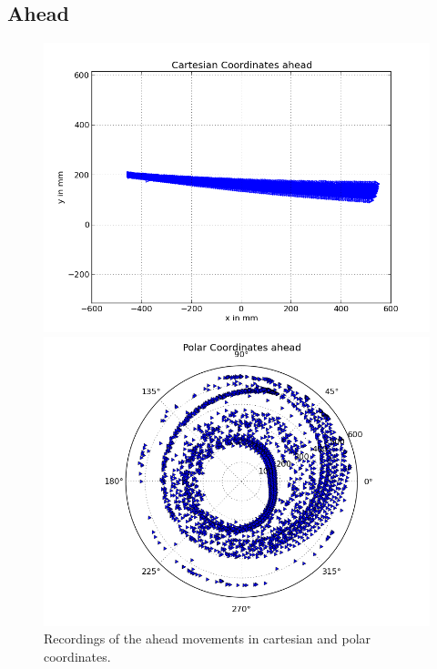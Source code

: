 \documentclass{scrartcl}
\begin{document}
\subsection{Ahead}
\begin{figure}[H]
\centering
\begin{minipage}{.5\textwidth}
  \centering
  \includegraphics[width=.8\linewidth]{img/ahead_c.png}
\end{minipage}%
\begin{minipage}{.5\textwidth}
  \centering
  \includegraphics[width=.8\linewidth]{img/ahead_pc_c.png}
\end{minipage}
\caption{Recordings of the ahead movements in cartesian and polar coordinates.}
\label{fig:ahead}
\end{figure}
\end{document}
